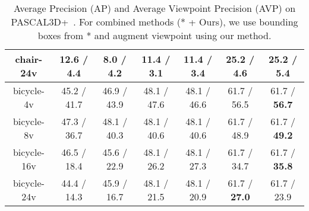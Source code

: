 \begin{table*}[t]
\begin{center}
\begin{tabular}{|c||c||c||c|c||c|c|}
    chair-24v           & 12.6 / 4.4          & 8.0  / 4.2              &  11.4 / 3.1       & 11.4 / 3.4         & 25.2 / 4.6          & 25.2 / \textbf{5.4} \\ \hline
    \hline
    bicycle-4v          & 45.2 / 41.7         & 46.9 / 43.9             & 48.1 / 47.6       & 48.1 / 46.6        & 61.7 / 56.5         & 61.7 / \textbf{56.7}\\ \hline
    bicycle-8v          & 47.3 / 36.7         & 48.1 / 40.3             & 48.1 / 40.6       & 48.1 / 40.6        & 61.7 / 48.9         & 61.7 / \textbf{49.2}\\ \hline
    bicycle-16v         & 46.5 / 18.4         & 45.6 / 22.9             & 48.1 / 26.2       & 48.1 / 27.3        & 61.7 / 34.7         & 61.7 / \textbf{35.8}\\ \hline
    bicycle-24v         & 44.4 / 14.3         & 45.9 / 16.7             & 48.1 / 21.5       & 48.1 / 20.9        & 61.7 / \textbf{27.0}         & 61.7 / 23.9\\ \hline
    \end{tabular}
  \end{center}
\caption{Average Precision (AP) and Average Viewpoint Precision (AVP) on
  PASCAL3D+~\cite{Xiang14}. For combined methods (* + Ours), we use
  bounding boxes from * and augment viewpoint using our method.}
\label{tab:pascal12}
\end{table*}

\begin{comment}
\hline
boat-4v             & 3.0 / 1.5           & 0.5 / 0.3               &  /        &  /         & 27.9 / 11.3         & 27.9 / 11.5 \\ \hline
boat-8v             & 5.8 / 1.0           & 0.5 / 0.2               &  /        &  /         & 27.9 / 5.4          & 27.9 / 5.4 \\ \hline
boat-16v            & 6.2 / 0.5           & 0.7 / 0.3               &  /        &  /         & 27.9 / 2.0          & 27.9 / 2.0 \\ \hline
boat-24v            & 6.0 / 0.3           & 5.3 / 2.2               &  /        &  /         & 27.9 / 1.8          & 27.9 / 2.5 \\ \hline
\end{comment}

